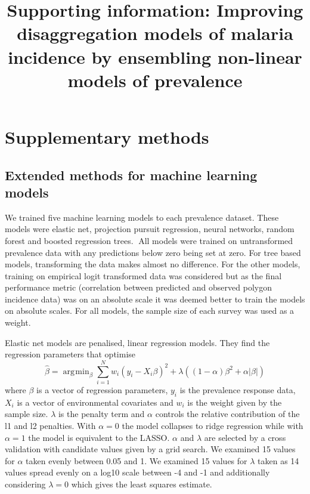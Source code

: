 \documentclass[review]{elsarticle}
\DeclareMathOperator*{\argmin}{\arg\!\min}
\begin{document}









\begin{frontmatter}

\title{Supporting information: Improving disaggregation models of malaria incidence by ensembling non-linear models of prevalence}

\end{frontmatter}

\clearpage
\tableofcontents

\section{Supplementary methods}

\subsection{Extended methods for machine learning models}

We trained five machine learning models to each prevalence dataset.
These models were elastic net, projection pursuit regression,  neural networks, random forest and boosted regression trees.
All models were trained on untransformed prevalence data with any predictions below zero being set at zero.
For tree based models, transforming the data makes almost no difference.
For the other models, training on empirical logit transformed data was considered but as the final performance metric (correlation between predicted and observed polygon incidence data) was on an absolute scale it was deemed better to train the models on absolute scales.
For all models, the sample size of each survey was used as a weight.

Elastic net models are penalised, linear regression models.
They find the regression parameters that optimise
$$\hat{\beta} = \argmin_\beta \sum_{i=1}^N w_i(y_i - X_i\beta) ^ 2 + \lambda\left((1-\alpha)\beta^2 + \alpha|\beta|\right)$$
where $\beta$ is a vector of regression parameters, $y_i$ is the prevalence response data, $X_i$ is a vector of environmental covariates and $w_i$ is the weight given by the sample size. 
$\lambda$ is the penalty term and $\alpha$ controls the relative contribution of the l1 and l2 penalties.
With $\alpha = 0$ the model collapses to ridge regression while with $\alpha = 1$ the model is equivalent to the LASSO.
$\alpha$ and $\lambda$ are selected by a cross validation with candidate values given by a grid search.
We examined 15 values for $\alpha$ taken evenly between 0.05 and 1.
We examined 15 values for $\lambda$ taken as 14 values spread evenly on a log10 scale between -4 and -1 and additionally considering $\lambda = 0$ which gives the least squares estimate.
\end{document}
